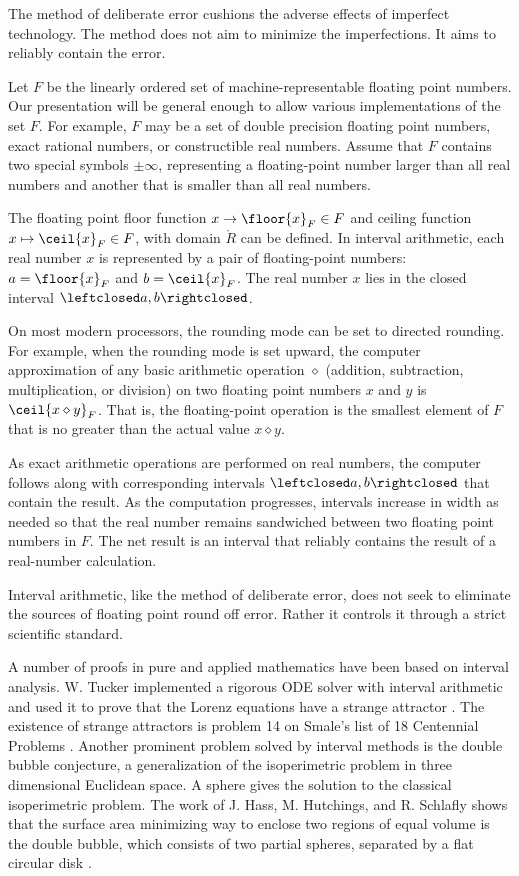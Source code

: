 The method of deliberate error cushions the adverse effects of
imperfect technology.  The method does not aim to minimize the
imperfections.  It aims to reliably contain the error.


Let $F$ be the linearly ordered set of machine-representable floating
point numbers.  Our presentation will be general enough to allow
various implementations of the set $F$.  For example, $F$ may be a set of
 double precision floating
point numbers, exact rational numbers, or constructible real numbers.
Assume that $F$ contains two special symbols $\pm\infty$,
representing a floating-point number larger than all real numbers and
another that is smaller than all real numbers.  

The floating point floor function $x\to\floor{x}_F\in
F$ and ceiling function $x\mapsto\ceil{x}_F\in F$, with domain
$\ring{R}$ can be defined.  In interval arithmetic, each real number
$x$ is represented by a pair of floating-point numbers:
$a=\floor{x}_F$ and $b=\ceil{x}_F$. The real number $x$ lies in the
closed interval $\leftclosed a,b\rightclosed$.

On most modern processors, the rounding mode can be set to directed
rounding.  For example, when the rounding mode is set upward, the
computer approximation of any basic arithmetic operation $\diamond$
(addition, subtraction, multiplication, or division) on two floating
point numbers $x$ and $y$ is $\ceil{x\diamond y}_F$.  That is, the
floating-point operation is the smallest element of $F$ that is no
greater than the actual value $x\diamond y$.

As exact arithmetic operations are performed on real numbers, the
computer follows along with corresponding intervals $\leftclosed
a,b\rightclosed$ that contain the result.  As the computation
progresses, intervals increase in width as needed so that the real
number remains sandwiched between two floating point numbers in $F$.
The net result is an interval that reliably contains the result of a
real-number calculation.

Interval arithmetic, like the method of deliberate error, does not
seek to eliminate the sources of floating point round off error.
Rather it controls it through a strict scientific standard.


A number of proofs in pure and applied mathematics have been based on
interval analysis.  W. Tucker implemented a rigorous ODE solver with
interval arithmetic and used it to prove that the Lorenz equations
have a strange attractor \cite{Tuc02}. The existence of strange
attractors is problem 14 on Smale's list of 18 Centennial Problems
\cite{Sma98}.  Another prominent problem solved by interval methods is
the double bubble conjecture, a generalization of the isoperimetric
problem in three dimensional Euclidean space.  A sphere gives the
solution to the classical isoperimetric problem.  The work of J. Hass,
M. Hutchings, and R. Schlafly shows that the surface area minimizing
way to enclose two regions of equal volume is the double bubble, which
consists of two partial spheres, separated by a flat circular disk
\cite{HHS95}.

